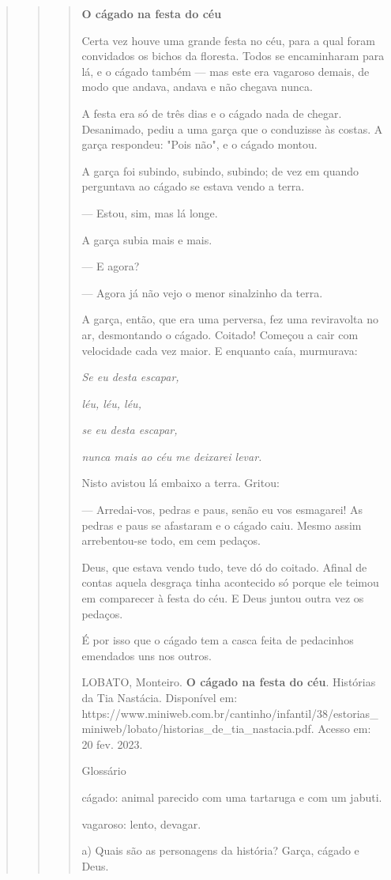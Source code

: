 \begin{quote}
\begin{quote}
\begin{quote}
\textbf{O cágado na festa do céu}

Certa vez houve uma grande festa no céu, para a qual foram convidados os
bichos da floresta. Todos se encaminharam para lá, e o cágado também ---
mas este era vagaroso demais, de modo que andava, andava e não chegava
nunca.

A festa era só de três dias e o cágado nada de chegar. Desanimado, pediu
a uma garça que o conduzisse às costas. A garça respondeu: "Pois não", e
o cágado montou.

A garça foi subindo, subindo, subindo; de vez em quando perguntava ao
cágado se estava vendo a terra.

--- Estou, sim, mas lá longe.

A garça subia mais e mais.

--- E agora?

--- Agora já não vejo o menor sinalzinho da terra.

A garça, então, que era uma perversa, fez uma reviravolta no ar,
desmontando o cágado. Coitado! Começou a cair com velocidade cada vez
maior. E enquanto caía, murmurava:

\emph{Se eu desta escapar,}

\emph{léu, léu, léu,}

\emph{se eu desta escapar,}

\emph{nunca mais ao céu me deixarei levar.}

Nisto avistou lá embaixo a terra. Gritou:

--- Arredai-vos, pedras e paus, senão eu vos esmagarei! As pedras e paus
se afastaram e o cágado caiu. Mesmo assim arrebentou-se todo, em cem
pedaços.

Deus, que estava vendo tudo, teve dó do coitado. Afinal de contas aquela
desgraça tinha acontecido só porque ele teimou em comparecer à festa do
céu. E Deus juntou outra vez os pedaços.

É por isso que o cágado tem a casca feita de pedacinhos emendados uns
nos outros.

LOBATO, Monteiro. \textbf{O cágado na festa do céu}. Histórias da Tia
Nastácia. Disponível em:
https://www.miniweb.com.br/cantinho/infantil/38/estorias\_miniweb/lobato/historias\_de\_tia\_nastacia.pdf.
Acesso em: 20 fev. 2023.

Glossário

cágado: animal parecido com uma tartaruga e com um jabuti.

vagaroso: lento, devagar.

a) Quais são as personagens da história? Garça, cágado e Deus.


\end{quote}
\end{quote}
\end{quote}
